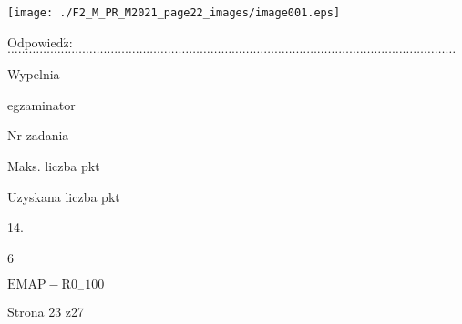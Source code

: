 \documentclass[a4paper,12pt]{article}
\begin{document}
\begin{center}
\texttt{[image: ./F2\_M\_PR\_M2021\_page22\_images/image001.eps]}
\end{center}
$\mathrm{O}\mathrm{d}\mathrm{p}\mathrm{o}\mathrm{w}\mathrm{i}\mathrm{e}\mathrm{d}\acute{\mathrm{z}}$:$\ldots\ldots\ldots\ldots\ldots\ldots\ldots\ldots\ldots\ldots\ldots\ldots\ldots\ldots\ldots\ldots\ldots\ldots\ldots\ldots\ldots\ldots\ldots\ldots\ldots\ldots\ldots\ldots\ldots\ldots\ldots\ldots\ldots\ldots\ldots\ldots\ldots\ldots\ldots\ldots\ldots\ldots$

Wypelnia

egzaminator

Nr zadania

Maks. liczba pkt

Uzyskana liczba pkt

14.

6

$\mathrm{E}\mathrm{M}\mathrm{A}\mathrm{P}-\mathrm{R}0_{-}100$

Strona 23 z27
\end{document}
